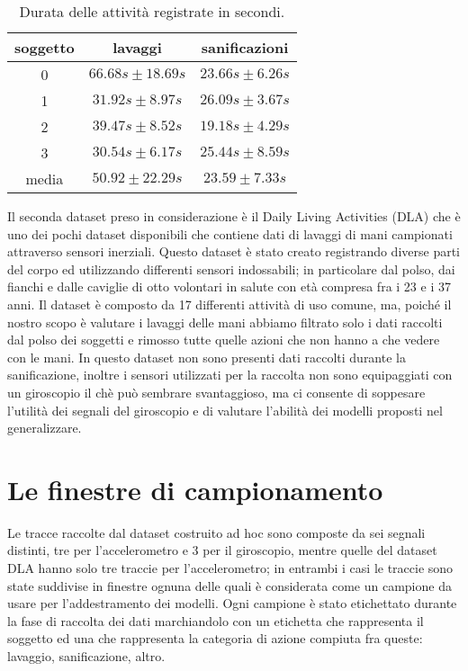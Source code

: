 \begin{table}
    \centering
    \begin{tabular}{c c c}
        \hline
        \textbf{soggetto} & \textbf{lavaggi} & \textbf{sanificazioni}  \\
        \hline
        0 & $66.68s \pm 18.69s$ & $23.66s \pm 6.26s$  \\
        1 & $31.92s \pm 8.97s$  & $26.09s \pm 3.67s$  \\
        2 & $39.47s \pm 8.52s$  & $19.18s \pm 4.29s$  \\
        3 & $30.54s \pm 6.17s$  & $25.44s \pm 8.59s$ \\
        \hline
        media & $50.92 \pm 22.29s$  & $23.59 \pm 7.33s$ \\
        \hline
    \end{tabular}
    \caption{Durata delle attività registrate in secondi.}
    \label{tab:activity-duration}
\end{table}

Il seconda dataset preso in considerazione è il Daily Living Activities (DLA) che è uno dei pochi dataset disponibili che contiene dati di lavaggi di mani campionati attraverso sensori inerziali. Questo dataset è stato creato registrando diverse parti del corpo ed utilizzando differenti sensori indossabili; in particolare dal polso, dai fianchi e dalle caviglie di otto volontari in salute con età compresa fra i 23 e i 37 anni. Il dataset è composto da 17 differenti attività di uso comune, ma, poiché il nostro scopo è valutare i lavaggi delle mani abbiamo filtrato solo i dati raccolti dal polso dei soggetti e rimosso tutte quelle azioni che non hanno a che vedere con le mani. In questo dataset non sono presenti dati raccolti durante la sanificazione, inoltre i sensori utilizzati per la raccolta non sono equipaggiati con un giroscopio il chè può sembrare svantaggioso, ma ci consente di soppesare l'utilità dei segnali del giroscopio e di valutare l'abilità dei modelli proposti nel generalizzare.

\section{Le finestre di campionamento}
\label{sec:windows}

Le tracce raccolte dal dataset costruito ad hoc sono composte da sei segnali distinti, tre per l'accelerometro e 3 per il giroscopio, mentre quelle del dataset DLA hanno solo tre traccie per l'accelerometro; in entrambi i casi le traccie sono state suddivise in finestre ognuna delle quali è considerata come un campione da usare per l'addestramento dei modelli. Ogni campione è stato etichettato durante la fase di raccolta dei dati marchiandolo con un etichetta che rappresenta il soggetto ed una che rappresenta la categoria di azione compiuta fra queste: lavaggio, sanificazione, altro.

